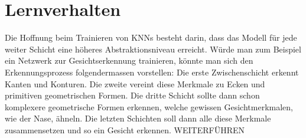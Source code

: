 \section{Lernverhalten}
Die Hoffnung beim Trainieren von KNNs besteht darin, dass das Modell für jede
weiter Schicht eine höheres Abstraktionsniveau erreicht. Würde man zum
Beispiel ein Netzwerk zur Gesichtserkennung trainieren, könnte man sich den
Erkennungsprozess folgendermassen vorstellen: Die erste Zwischenschicht erkennt
Kanten und Konturen. Die zweite vereint diese Merkmale zu Ecken und primitiven
geometrischen Formen. Die dritte Schicht sollte dann schon komplexere
geometrische Formen erkennen, welche gewissen Gesichtmerkmalen, wie der Nase, ähneln. Die letzten Schichten soll dann alle diese
Merkmale zusammensetzen und so ein Gesicht erkennen.
WEITERFÜHREN

